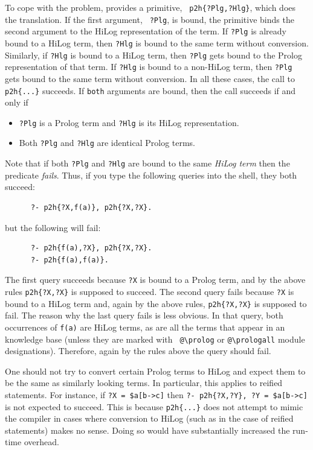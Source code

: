 \documentclass[11pt]{article}
\newcommand{\ERGO}{\mbox{\smaller{\ensuremath{\cal{E}}\smaller{{\sc{RGO}}}}}\xspace}
\newcommand{\FLSYSTEM}{\ERGO}
\newcommand{\bs}{\textbackslash}
\begin{document}
To cope with the problem, \FLSYSTEM provides a primitive, {\tt
  p2h\{?Plg,?Hlg\}}, which does the translation. If the first argument, {\tt
  ?Plg}, is bound, the primitive binds the second argument to the HiLog
representation of the term. If {\tt ?Plg} is already bound to a HiLog term,
then {\tt ?Hlg} is bound to the same term without conversion.  Similarly, if
{\tt ?Hlg} is bound to a HiLog term, then {\tt ?Plg} gets bound to the Prolog
representation of that term. If {\tt ?Hlg} is bound to a non-HiLog term,
then {\tt ?Plg} gets bound to the same term without conversion. In all these
cases, the call to {\tt p2h\{...\}} succeeds. If {\tt both} arguments are
bound, then the call succeeds if and only if
\begin{itemize}
\item {\tt ?Plg} is a Prolog term and {\tt ?Hlg} is its HiLog
  representation.
\item Both {\tt ?Plg} and {\tt ?Hlg} are identical Prolog terms.
\end{itemize}
Note that if both {\tt ?Plg} and {\tt ?Hlg} are bound to the same
\emph{HiLog term} then the predicate \emph{fails}. Thus, if you type the
following queries into the \FLSYSTEM shell, they both succeed:
\begin{verbatim}
      ?- p2h{?X,f(a)}, p2h{?X,?X}.
\end{verbatim}
but the following will fail:
\begin{verbatim}
      ?- p2h{f(a),?X}, p2h{?X,?X}.
      ?- p2h{f(a),f(a)}.
\end{verbatim}
The first query succeeds because {\tt ?X}  is bound to a Prolog term, and by the
above rules {\tt p2h\{?X,?X\}} is supposed to succeed. The second query fails
because {\tt ?X} is bound to a HiLog term and, again by the above rules,
{\tt p2h\{?X,?X\}} is supposed to fail.
The reason why the last query fails is less obvious.
In that query, both occurrences of {\tt f(a)} are HiLog terms, as are all the
terms that appear in an \FLSYSTEM knowledge base (unless they are marked with {\tt
  @\bs{}prolog} or {\tt @\bs{}prologall} module designations). Therefore, again by
the rules above the query should fail.

One should not try to convert certain Prolog terms to
HiLog and expect them to be the same as similarly looking \FLSYSTEM terms. In
particular, this applies to reified statements. For instance, if {\tt ?X =
\${a[b->c]}} then {\tt ?- p2h\{?X,?Y\}, ?Y = \${a[b->c]}} is not expected to
succeed. This is because {\tt p2h\{...\}} does not attempt to mimic the \FLSYSTEM
compiler in cases where conversion to HiLog (such as in the case of reified
statements) makes no sense. Doing so would have substantially increased the
run-time overhead.
\end{document}
